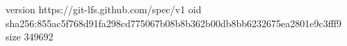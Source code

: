 version https://git-lfs.github.com/spec/v1
oid sha256:855ac5f768d91fa298cd775067b08b8b362b00db8bb6232675ea2801e9c3fff9
size 349692
